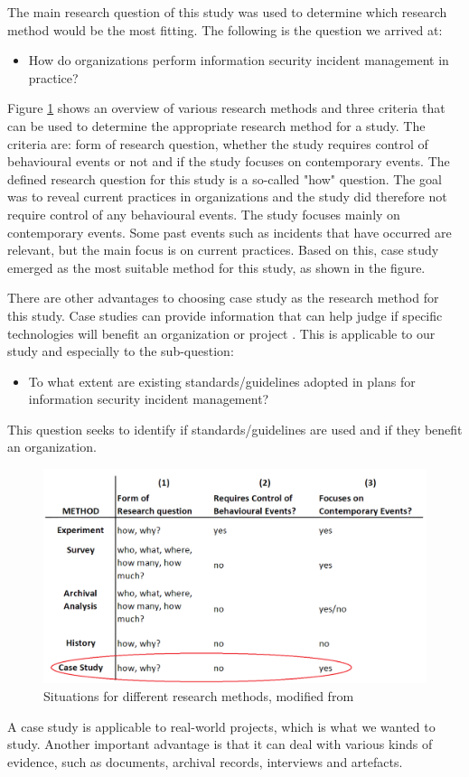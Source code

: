 \label{sec:choiceOfMethod}
The main research question of this study was used to determine which research method would be the most fitting. The following is the question we arrived at:

\begin{itemize}
\item How do organizations perform information security incident management in practice?
\end{itemize}

Figure \ref{fig:methods} shows an overview of various research methods and three criteria that can be used to determine the appropriate research method for a study. The criteria are: form of research question, whether the study requires control of behavioural events or not and if the study focuses on contemporary events. The defined research question for this study is a so-called "how" question. The goal was to reveal current practices in organizations and the study did therefore not require control of any behavioural events. The study focuses mainly on contemporary events. Some past events such as incidents that have occurred are relevant, but the main focus is on current practices. Based on this, case study emerged as the most suitable method for this study, as shown in the figure.

There are other advantages to choosing case study as the research method for this study. Case studies can provide information that can help judge if specific technologies will benefit an organization or project \cite{kitchenham1995case}. This is applicable to our study and especially to the sub-question:

\begin{itemize}
\item To what extent are existing standards/guidelines adopted in plans for information security incident management?
\end{itemize}

This question seeks to identify if standards/guidelines are used and if they benefit an organization.

\begin{figure}[H]
\begin{center}
\includegraphics[scale=0.35]{methods.png}
\caption[Situations for different research methods]{Situations for different research methods, modified from \cite{CaseStudyResearch}}
\label{fig:methods}
\end{center}
\end{figure}

A case study is applicable to real-world projects, which is what we wanted to study. Another important advantage is that it can deal with various kinds of evidence, such as documents, archival records, interviews and artefacts.